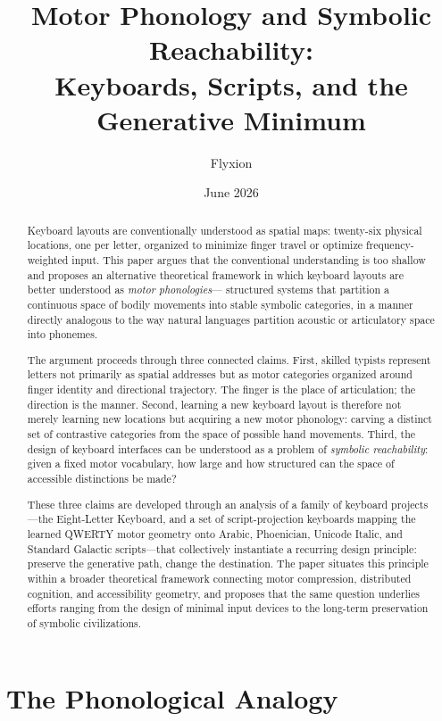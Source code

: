 \documentclass[12pt,a4paper]{article}
\title{\textbf{Motor Phonology and Symbolic Reachability:\\
Keyboards, Scripts, and the Generative Minimum}}
\author{Flyxion}
\date{June 2026}
\theoremstyle{plain}
\theoremstyle{definition}
\theoremstyle{remark}
\begin{document}
\maketitle

\begin{abstract}
\noindent
Keyboard layouts are conventionally understood as spatial maps: twenty-six
physical locations, one per letter, organized to minimize finger travel or
optimize frequency-weighted input. This paper argues that the conventional
understanding is too shallow and proposes an alternative theoretical framework
in which keyboard layouts are better understood as \emph{motor phonologies}---
structured systems that partition a continuous space of bodily movements into
stable symbolic categories, in a manner directly analogous to the way natural
languages partition acoustic or articulatory space into phonemes.

The argument proceeds through three connected claims. First, skilled typists
represent letters not primarily as spatial addresses but as motor categories
organized around finger identity and directional trajectory. The finger is the
place of articulation; the direction is the manner. Second, learning a new
keyboard layout is therefore not merely learning new locations but acquiring
a new motor phonology: carving a distinct set of contrastive categories from
the space of possible hand movements. Third, the design of keyboard interfaces
can be understood as a problem of \emph{symbolic reachability}: given a fixed
motor vocabulary, how large and how structured can the space of accessible
distinctions be made?

These three claims are developed through an analysis of a family of keyboard
projects---the Eight-Letter Keyboard, and a set of script-projection keyboards
mapping the learned QWERTY motor geometry onto Arabic, Phoenician, Unicode
Italic, and Standard Galactic scripts---that collectively instantiate a
recurring design principle: preserve the generative path, change the
destination. The paper situates this principle within a broader theoretical
framework connecting motor compression, distributed cognition, and
accessibility geometry, and proposes that the same question underlies
efforts ranging from the design of minimal input devices to the long-term
preservation of symbolic civilizations.
\end{abstract}

\bigskip

\section{The Phonological Analogy}
\end{document}
